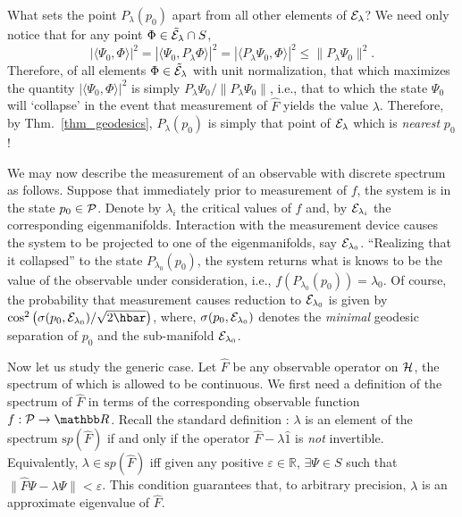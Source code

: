 \documentclass[12pt,aps,eqsecnum,tighten]{revtex4-2}
\def\be{\begin{equation}}
\def\ee{\end{equation}}
\def\<{\langle}
\def\>{\rangle}
\def\H{{\cal H}}
\def\P{{\cal P}}
\def\Bbb{}
\def\R{\mathbb R}
\begin{document}
What sets the point ${\Bbb P}_\lambda(p_0)$ apart from all other
elements of  ${\cal E}_\lambda$?  We need only notice that for any
point  $\Phi \in \tilde{\cal E}_\lambda \cap S$,
%
\be\label{projection-ineq}
\left| \< \Psi_0, \Phi \> \right|^2 =
\left| \< \Psi_0, {\Bbb P}_\lambda \Phi \> \right|^2 =
\left| \< {\Bbb P}_\lambda \Psi_0, \Phi \> \right|^2 \le
\| {\Bbb P}_\lambda \Psi_0 \|^2.
\ee
%
Therefore, of all elements $\Phi \in \tilde{\cal E}_\lambda$ with unit
normalization, that which maximizes the quantity $|\<
\Psi_0,\Phi\>|^2$ is simply ${\Bbb P}_\lambda \Psi_0 / \| {\Bbb
P}_\lambda \Psi_0 \|$, i.e., that to which the state $\Psi_0$ will
`collapse' in the event that measurement of $\hat{F}$ yields the value
$\lambda$.  Therefore, by Thm.~\ref{thm_geodesics}, ${\Bbb
P}_\lambda(p_0)$ is simply that point of ${\cal E}_\lambda$ which is
{\em nearest} $p_0$!

We may now describe the measurement of an observable with discrete
spectrum as follows.  Suppose that immediately prior to measurement of
$f$, the system is in the state $p_0 \in \P$.  Denote by $\lambda_i$
the critical values of $f$ and, by ${\cal E}_{\lambda_i}$ the
corresponding eigenmanifolds.  Interaction with the measurement device
causes the system to be projected to one of the eigenmanifolds, say
${\cal E}_{\lambda_0}$.  ``Realizing that it collapsed'' to the state
${\Bbb P}_{\lambda_0}(p_0)$, the system returns what is knows to be
the value of the observable under consideration, i.e., $f\left( {\Bbb
P}_{\lambda_0}(p_0)\right) = \lambda_0$.  Of course, the probability
that measurement causes reduction to ${\cal E}_{\lambda_0}$ is given
by $\cos^2 \left( \sigma(p_0,{\cal E}_{\lambda_0}) / \sqrt{2\hbar}
\right)$, where, $\sigma(p_0,{\cal E}_{\lambda_0})$ denotes the {\em
minimal} geodesic separation of $p_0$ and the sub-manifold ${\cal
E}_{\lambda_0}$.

Now let us study the generic case.  Let $\hat{F}$ be any observable
operator on $\H$, the spectrum of which is allowed to be continuous.
We first need a definition of the spectrum of $\hat{F}$ in terms of
the corresponding observable function $f:\P\rightarrow\R$.  Recall the
standard definition \cite{reed-simon}: $\lambda$ is an element of the
spectrum ${\mathrm sp}(\hat{F})$ if and only if the operator $\hat{F}
- \lambda\hat{1}$ is {\em not} invertible.  Equivalently, $\lambda \in
{\mathrm sp}(\hat{F})$ iff given any positive $\varepsilon\in\R$,
$\exists \Psi\in S$ such that $\| \hat{F}\Psi - \lambda\Psi \| <
\varepsilon$.  This condition guarantees that, to arbitrary precision,
$\lambda$ is an approximate eigenvalue of $\hat{F}$.
\end{document}
